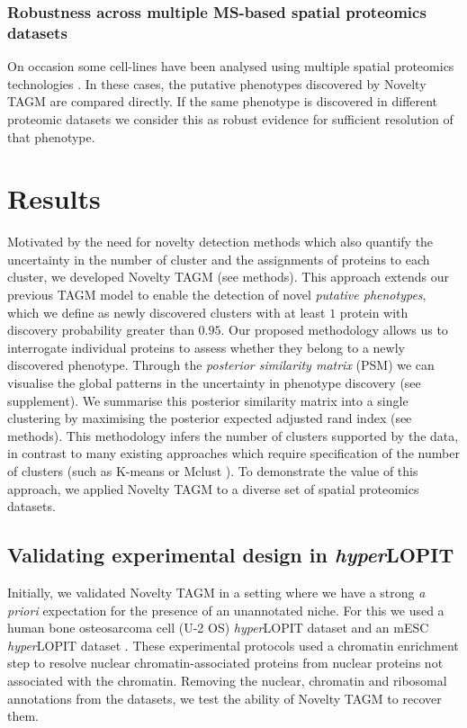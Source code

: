 \documentclass[12pt,english]{article}
\begin{document}
\subsubsection{Robustness across multiple MS-based spatial proteomics datasets}
On occasion some cell-lines have been analysed using multiple spatial proteomics technologies \citep{DC:2018}. In these cases, the putative phenotypes discovered by Novelty TAGM are compared directly. If the same phenotype is discovered in different proteomic datasets we consider this as robust evidence for sufficient resolution of that phenotype.

\clearpage
\section{Results}
Motivated by the need for novelty detection methods which also quantify the uncertainty in the number of cluster and the assignments of proteins to each cluster, we developed Novelty TAGM (see methods). This approach extends our previous TAGM model \citep{Crook:2018} to enable the detection of novel \textit{putative phenotypes}, which we define as newly discovered clusters with at least $1$ protein with discovery probability greater than $0.95$. Our proposed methodology allows us to interrogate individual proteins to assess whether they belong to a newly discovered phenotype. Through the \textit{posterior similarity matrix} (PSM) we can visualise the global patterns in the uncertainty in phenotype discovery (see supplement). We summarise this posterior similarity matrix into a single clustering by maximising the posterior expected adjusted rand index (see methods). This methodology infers the number of clusters supported by the data, in contrast to many existing approaches which require specification of the number of clusters (such as K-means or Mclust \citep{mclust}). To demonstrate the value of this approach, we applied Novelty TAGM to a diverse set of spatial proteomics datasets.

\subsection{Validating experimental design in \textit{hyper}LOPIT}
Initially, we validated Novelty TAGM in a setting where we have a strong \textit{a priori} expectation for the presence of an unannotated niche. For this we used a human bone osteosarcoma cell (U-2 OS) \textit{hyper}LOPIT dataset \citep{Thul:2017} and an mESC \textit{hyper}LOPIT dataset \citep{hyper}. These experimental protocols used a chromatin enrichment step to resolve nuclear chromatin-associated proteins from nuclear proteins not associated with the chromatin. Removing the nuclear, chromatin and ribosomal annotations from the datasets, we test the ability of Novelty TAGM to recover them.
\end{document}
